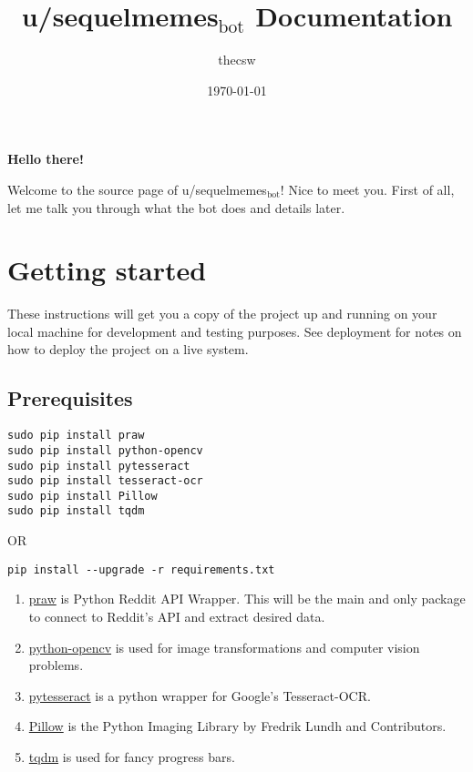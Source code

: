 \documentclass[11pt]{article}
\author{thecsw}
\date{\today}
\title{u/sequelmemes$_{\text{bot}}$ Documentation}
\begin{document}
\maketitle
\tableofcontents

\textbf{Hello there!}

Welcome to the source page of u/sequelmemes$_{\text{bot}}$! Nice to meet you. First of all, let me talk you through what the bot does and details later.

\section{Getting started}
\label{sec-1}

These instructions will get you a copy of the project up and running on your local machine for development and testing purposes. 
See deployment for notes on how to deploy the project on a live system.

\subsection{Prerequisites}
\label{sec-1-1}

\begin{verbatim}
sudo pip install praw
sudo pip install python-opencv
sudo pip install pytesseract
sudo pip install tesseract-ocr
sudo pip install Pillow
sudo pip install tqdm
\end{verbatim}

OR

\begin{verbatim}
pip install --upgrade -r requirements.txt
\end{verbatim}
\begin{enumerate}
\item \href{https://github.com/praw-dev/praw}{praw} is Python Reddit API Wrapper. This will be the main and only package to
connect to Reddit's API and extract desired data.
\item \href{https://pypi.python.org/pypi/opencv-python}{python-opencv} is used for image transformations and computer vision problems.
\item \href{https://pypi.python.org/pypi/pytesseract}{pytesseract} is a python wrapper for Google's Tesseract-OCR.
\item \href{https://pillow.readthedocs.io/en/latest/}{Pillow} is the Python  Imaging Library by Fredrik Lundh and Contributors.
\item \href{https://pypi.python.org/pypi/tqdm}{tqdm} is used for fancy progress bars.
\end{enumerate}
\end{document}
